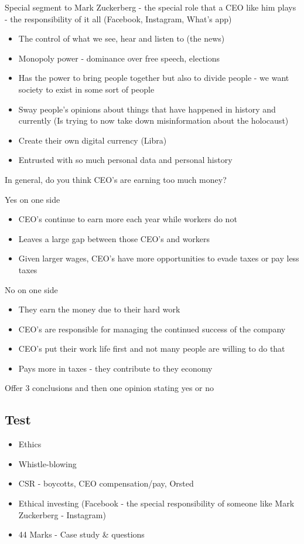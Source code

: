 \documentclass[11pt]{article}
\begin{document}
Special segment to Mark Zuckerberg - the special role that a CEO like him plays - the responsibility of it all (Facebook, Instagram, What's app)

\begin{itemize}
    \item The control of what we see, hear and listen to (the news)
    \item Monopoly power - dominance over free speech, elections
    \item Has the power to bring people together but also to divide people - we want society to exist in some sort of people
    \item Sway people's opinions about things that have happened in history and currently (Is trying to now take down misinformation about the holocaust)
    \item Create their own digital currency (Libra)
    \item Entrusted with so much personal data and personal history
\end{itemize}


    In general, do you think CEO's are earning too much money?

    Yes on one side
    \begin{itemize}
        \item CEO's continue to earn more each year while workers do not
        \item Leaves a large gap between those CEO's and workers
        \item Given larger wages, CEO's have more opportunities to evade taxes or pay less taxes
    \end{itemize}

    No on one side
    \begin{itemize}
        \item They earn the money due to their hard work
        \item CEO's are responsible for managing the continued success of the company
        \item CEO's put their work life first and not many people are willing to do that
        \item Pays more in taxes - they contribute to they economy
    \end{itemize}

    Offer 3 conclusions and then one opinion stating yes or no

\subsection{Test}
\begin{itemize}
    \item Ethics
    \item Whistle-blowing
    \item CSR - boycotts, CEO compensation/pay, Orsted
    \item Ethical investing (Facebook - the special responsibility of someone like Mark Zuckerberg - Instagram)
    \item 44 Marks - Case study \& questions
\end{itemize}
\end{document}
